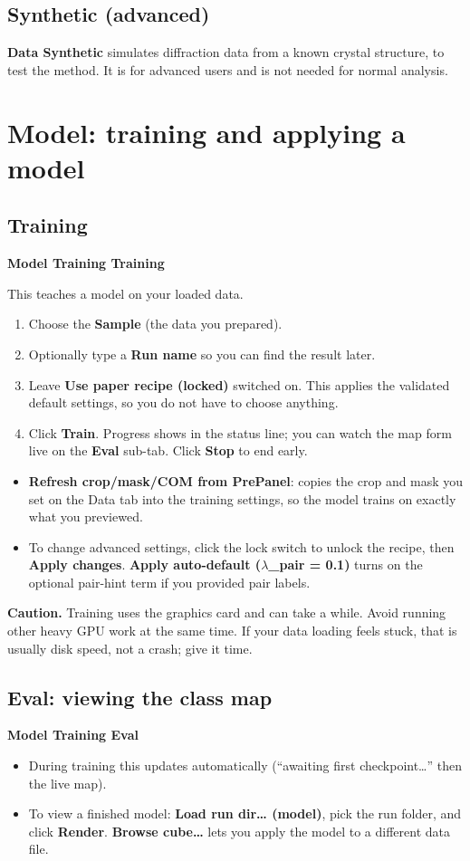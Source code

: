 \documentclass[11pt]{article}
\newcommand{\btn}[1]{\textbf{#1}}
\newcommand{\tab}[1]{\textsf{\textbf{#1}}}
\newcommand{\caution}[1]{\par\smallskip\noindent\colorbox{warn}{\parbox{\dimexpr\linewidth-2\fboxsep}{\textbf{Caution.} #1}}\par\smallskip}
\begin{document}
\subsection{Synthetic (advanced)}
\tab{Data \textrightarrow{} Synthetic} simulates diffraction data from a known
crystal structure, to test the method. It is for advanced users and is not needed
for normal analysis.

\section{Model: training and applying a model}
\subsection{Training}
\tab{Model \textrightarrow{} Training \textrightarrow{} Training}

This teaches a model on your loaded data.
\begin{enumerate}[itemsep=2pt]
\item Choose the \textbf{Sample} (the data you prepared).
\item Optionally type a \textbf{Run name} so you can find the result later.
\item Leave \btn{Use paper recipe (locked)} switched on. This applies the
validated default settings, so you do not have to choose anything.
\item Click \btn{Train}. Progress shows in the status line; you can watch the map
form live on the \tab{Eval} sub-tab. Click \btn{Stop} to end early.
\end{enumerate}
\begin{itemize}[itemsep=2pt]
\item \btn{Refresh crop/mask/COM from PrePanel}: copies the crop and mask you set
on the Data tab into the training settings, so the model trains on exactly what you
previewed.
\item To change advanced settings, click the lock switch to unlock the recipe, then
\btn{Apply changes}. \btn{Apply auto-default ($\lambda$\_pair = 0.1)} turns on the
optional pair-hint term if you provided pair labels.
\end{itemize}
\caution{Training uses the graphics card and can take a while. Avoid running other
heavy GPU work at the same time. If your data loading feels stuck, that is usually
disk speed, not a crash; give it time.}

\subsection{Eval: viewing the class map}
\tab{Model \textrightarrow{} Training \textrightarrow{} Eval}
\begin{itemize}[itemsep=2pt]
\item During training this updates automatically (``awaiting first
checkpoint\dots'' then the live map).
\item To view a finished model: \btn{Load run dir\dots{} (model)}, pick the run
folder, and click \btn{Render}. \btn{Browse cube\dots} lets you apply the model to
a different data file.
\end{itemize}
\end{document}
